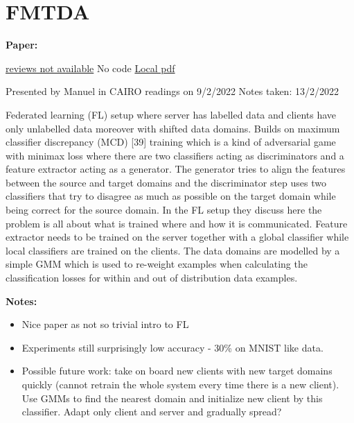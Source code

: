 \clearpage

\section{FMTDA}\label{sec:FMTDA}

\begin{notebox}
\textbf{Paper: } 
\vspace{5pt}

\href{https://openaccess.thecvf.com/content/WACV2022/html/Yao_Federated_Multi-Target_Domain_Adaptation_WACV_2022_paper.html}{reviews not available}
\hspace{1cm}
{No code}
\hspace{1cm}
\href{run:/home/magda/Dropbox/Zot/Yao et al_2022_Federated multi-target domain adaptation.pdf}{Local pdf}
\vspace{3pt}

Presented by Manuel in CAIRO readings on 9/2/2022
\hfill Notes taken: 13/2/2022 
\end{notebox}

\begin{notebox}[colback=red!5]
\tldr Federated learning (FL) setup where server has labelled data and clients have only unlabelled data moreover with shifted data domains. Builds on maximum classifier discrepancy (MCD) [39] training which is a kind of adversarial game with minimax loss where there are two classifiers acting as discriminators and a feature extractor acting as a generator. The generator tries to align the features between the source and target domains and the discriminator step uses two classifiers that try to disagree as much as possible on the target domain while being correct for the source domain. 
In the FL setup they discuss here the problem is all about what is trained where and how it is communicated. Feature extractor needs to be trained on the server together with a global classifier while local classifiers are trained on the clients. The data domains are modelled by a simple GMM which is used to re-weight examples when calculating the classification losses for within and out of distribution data examples.
\end{notebox}

\begin{notebox}[colback=yellow!5]
\textbf{Notes:} 
\begin{itemize}[nosep]
\item Nice paper as not so trivial intro to FL
\item Experiments still surprisingly low accuracy - 30\% on MNIST like data.
\item Possible future work: take on board new clients with new target domains quickly (cannot retrain the whole system every time there is a new client). Use GMMs to find the nearest domain and initialize new client by this classifier. Adapt only client and server and gradually spread?
\end{itemize}
\end{notebox}


